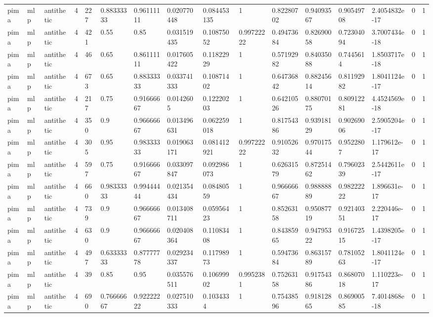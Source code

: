 \begin{tabular}{llllllllllllllll}
pima & mlp & antithetic & 4 & 227 & 0.88333333 & 0.96111111 & 0.020770448 & 0.084453135 & 1 & 0.82280702 & 0.94093567 & 0.90549708 & 2.4054832e-17 & 0 & 1 \\
pima & mlp & antithetic & 4 & 421 & 0.55 & 0.85 & 0.031519435 & 0.10875052 & 0.99722222 & 0.49473684 & 0.82690058 & 0.72304094 & 3.7007434e-18 & 0 & 1 \\
pima & mlp & antithetic & 4 & 46 & 0.65 & 0.86111111 & 0.017605422 & 0.11822929 & 1 & 0.57192982 & 0.84035088 & 0.7445614 & 1.8503717e-18 & 0 & 1 \\
pima & mlp & antithetic & 4 & 673 & 0.65 & 0.88333333 & 0.033741333 & 0.10871402 & 1 & 0.64736842 & 0.88245614 & 0.81192982 & 1.8041124e-17 & 0 & 1 \\
pima & mlp & antithetic & 4 & 217 & 0.75 & 0.91666667 & 0.0142605 & 0.12220203 & 1 & 0.64210526 & 0.88070175 & 0.80912281 & 4.4524569e-18 & 0 & 1 \\
pima & mlp & antithetic & 4 & 350 & 0.9 & 0.96666667 & 0.013496631 & 0.062259018 & 1 & 0.81754386 & 0.93918129 & 0.90269006 & 2.5905204e-17 & 0 & 1 \\
pima & mlp & antithetic & 4 & 305 & 0.95 & 0.98333333 & 0.019063171 & 0.081412921 & 0.99722222 & 0.91052632 & 0.97017544 & 0.9522807 & 1.179612e-17 & 0 & 1 \\
pima & mlp & antithetic & 4 & 597 & 0.75 & 0.91666667 & 0.033097847 & 0.092986073 & 1 & 0.62631579 & 0.87251462 & 0.79602339 & 2.5442611e-17 & 0 & 1 \\
pima & mlp & antithetic & 4 & 660 & 0.98333333 & 0.99444444 & 0.021354434 & 0.08480559 & 1 & 0.96666667 & 0.98888889 & 0.98222222 & 1.896631e-17 & 0 & 1 \\
pima & mlp & antithetic & 4 & 739 & 0.9 & 0.96666667 & 0.013408711 & 0.05956423 & 1 & 0.85263158 & 0.95087719 & 0.92140351 & 2.220446e-17 & 0 & 1 \\
pima & mlp & antithetic & 4 & 630 & 0.9 & 0.96666667 & 0.020408364 & 0.11083408 & 1 & 0.84385965 & 0.94795322 & 0.91672515 & 1.4398205e-17 & 0 & 1 \\
pima & mlp & antithetic & 4 & 497 & 0.63333333 & 0.87777778 & 0.029234337 & 0.11798973 & 1 & 0.59473684 & 0.86315789 & 0.78105263 & 1.8041124e-17 & 0 & 1 \\
pima & mlp & antithetic & 4 & 39 & 0.85 & 0.95 & 0.035576511 & 0.10699902 & 0.9952381 & 0.75263158 & 0.91754386 & 0.86807018 & 1.110223e-17 & 0 & 1 \\
pima & mlp & antithetic & 4 & 690 & 0.76666667 & 0.92222222 & 0.027510333 & 0.1034334 & 1 & 0.75438596 & 0.91812865 & 0.86900585 & 7.4014868e-18 & 0 & 1 \\

\end{tabular}
